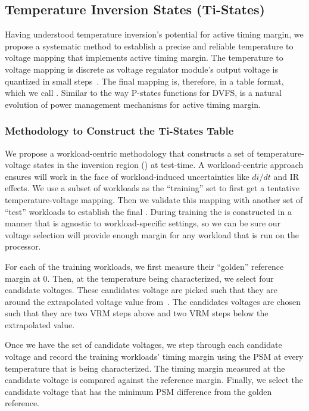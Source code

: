 \subsection{Temperature Inversion States (Ti-States)}
\label{sec:temperature:tistate}

Having understood temperature inversion's potential for active timing margin, we propose a systematic method to establish a precise and reliable temperature to voltage mapping that implements active timing margin. The temperature to voltage mapping is discrete as voltage regulator module's output voltage is quantized in small steps~\cite{intelVRM}. The final mapping is, therefore, in a table format, which we call \tistates. Similar to the way P-states functions for DVFS, \tistate is a natural evolution of power management mechanisms for active timing margin.

\subsubsection{Methodology to Construct the Ti-States Table}
\label{sec:temperature:temperature:construct}

We propose a workload-centric methodology that constructs a set of temperature-voltage states in the inversion region (\tistates) at test-time. A workload-centric approach ensures \tistates will work in the face of workload-induced uncertainties like $di/dt$ and IR effects. We use a subset of workloads as the ``training'' set to first get a tentative temperature-voltage mapping. Then we validate this mapping with another set of ``test'' workloads to establish the final \tistate. During training the \tistate is constructed in a manner that is agnostic to workload-specific settings, so we can be sure our voltage selection will provide enough margin for any workload that is run on the processor.

For each of the training workloads, we first measure their ``golden'' reference margin at 0\C. Then, at the temperature being characterized, we select four candidate voltages. These candidates voltage are picked such that they are around the extrapolated voltage value from~. The candidates voltages are chosen such that they are two VRM steps above and two VRM steps below the extrapolated value. 

Once we have the set of candidate voltages, we step through each candidate voltage and record the training workloads' timing margin using the PSM at every temperature that is being characterized. The timing margin measured at the candidate voltage is compared against the reference margin. Finally, we select the candidate voltage that has the minimum PSM difference from the golden reference. 

